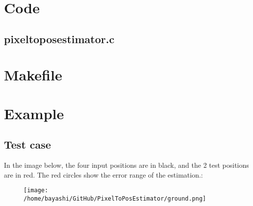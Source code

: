 \section{Code}

\subsection{pixeltoposestimator.c}

\begin{scriptsize}
\begin{ttfamily}

\end{ttfamily}
\end{scriptsize}

\section{Makefile}

\begin{scriptsize}
\begin{ttfamily}

\end{ttfamily}
\end{scriptsize}

\section{Example}

\subsection{Test case}

\begin{scriptsize}
\begin{ttfamily}

\end{ttfamily}
\end{scriptsize}

In the image below, the four input positions are in black, and the 2 test positions are in red. The red circles show the error range of the estimation.:\\
\begin{center}
\begin{figure}[H]
\centering\texttt{[image: /home/bayashi/GitHub/PixelToPosEstimator/ground.png]}\\
\end{figure}
\end{center}

